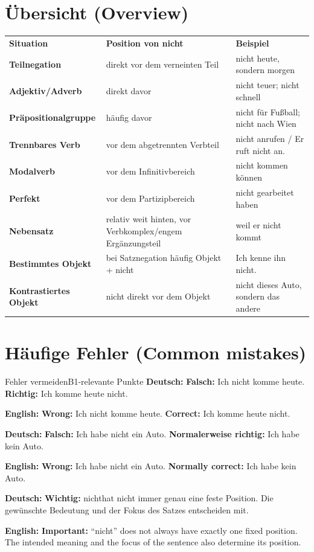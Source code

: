 \documentclass[a4paper,11pt]{article}
\newcommand{\GermanText}[1]{\textbf{Deutsch: }#1\par}
\newcommand{\EnglishText}[1]{{\small\color{SoftGray}\textbf{English: }#1\par}}
\begin{document}
\section{Übersicht \textnormal{(Overview)}}

\begin{longtable}{>{\bfseries}p{4.1cm}|p{5.2cm}|p{5.2cm}}
\rowcolor{HeaderBlueDark}
\color{white}\textbf{Situation} &
\color{white}\textbf{Position von nicht} &
\color{white}\textbf{Beispiel} \\
Teilnegation & direkt vor dem verneinten Teil & nicht heute, sondern morgen \\
Adjektiv/Adverb & direkt davor & nicht teuer; nicht schnell \\
Präpositionalgruppe & häufig davor & nicht für Fußball; nicht nach Wien \\
Trennbares Verb & vor dem abgetrennten Verbteil & nicht anrufen / Er ruft nicht an. \\
Modalverb & vor dem Infinitivbereich & nicht kommen können \\
Perfekt & vor dem Partizipbereich & nicht gearbeitet haben \\
Nebensatz & relativ weit hinten, vor Verbkomplex/engem Ergänzungsteil & weil er nicht kommt \\
Bestimmtes Objekt & bei Satznegation häufig Objekt + nicht & Ich kenne ihn nicht. \\
Kontrastiertes Objekt & nicht direkt vor dem Objekt & nicht dieses Auto, sondern das andere \\
\end{longtable}

\section{Häufige Fehler \textnormal{(Common mistakes)}}

\begin{grammarentry}{Fehler vermeiden}{B1-relevante Punkte}
\GermanText{\textbf{Falsch:} Ich nicht komme heute. \quad \textbf{Richtig:} Ich komme heute nicht.}
\EnglishText{\textbf{Wrong:} Ich nicht komme heute. \quad \textbf{Correct:} Ich komme heute nicht.}

\GermanText{\textbf{Falsch:} Ich habe nicht ein Auto. \quad \textbf{Normalerweise richtig:} Ich habe kein Auto.}
\EnglishText{\textbf{Wrong:} Ich habe nicht ein Auto. \quad \textbf{Normally correct:} Ich habe kein Auto.}

\GermanText{\textbf{Wichtig:} \glqq nicht\grqq hat nicht immer genau eine feste Position. Die gewünschte Bedeutung und der Fokus des Satzes entscheiden mit.}
\EnglishText{\textbf{Important:} ``nicht'' does not always have exactly one fixed position. The intended meaning and the focus of the sentence also determine its position.}
\end{grammarentry}
\end{document}
